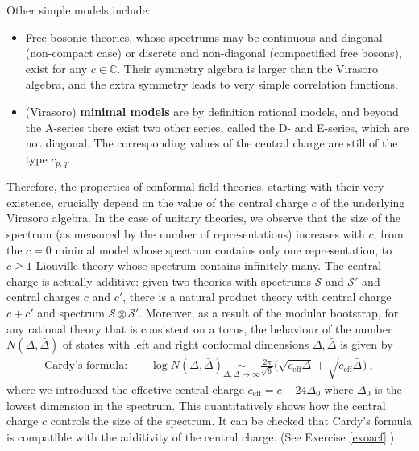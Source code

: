 \documentclass[12pt, a4paper, notitlepage, twoside]{report}
\numberwithin{equation}{section}
\theoremstyle{break}
\begin{document}
Other simple models include:
\begin{itemize}
 \item Free bosonic theories, whose spectrums may be continuous and diagonal (non-compact case) or discrete and non-diagonal (compactified free bosons), exist for any $c\in {\mathbb{C}}$.
Their symmetry algebra is larger than the Virasoro algebra, and  
the extra symmetry leads to very simple correlation functions.
 \item 
(Virasoro) \textbf{minimal models} are by definition rational models, and beyond the A-series there exist two other series, called the 
D- and E-series, which are not diagonal.
The corresponding values of the central charge are still of the type $c_{p,q}$.
\end{itemize}
Therefore,
the properties of conformal field theories, starting with their very existence, crucially depend on the value of the central charge $c$ of the underlying Virasoro algebra.
In the case of unitary theories, we observe that the size of the spectrum (as measured by the number of representations) increases with $c$, from the $c=0$ minimal model whose spectrum contains only one representation, to $c\geq 1$ Liouville theory whose spectrum contains infinitely many.
The central charge is actually additive: given two theories with spectrums $\mathcal{S}$ and $\mathcal{S}'$ and central charges $c$ and $c'$, there is a natural product theory with central charge $c+c'$ and spectrum $\mathcal{S}\otimes \mathcal{S}'$.
Moreover, as a result of the modular bootstrap, for any rational theory that is consistent on a torus, 
the behaviour of the number $N(\Delta,\bar{\Delta})$ of states with left and right conformal dimensions $\Delta,\bar{\Delta}$ is given by 
\begin{align}
\text{Cardy's formula:} \qquad \log N(\Delta,\bar{\Delta}) \underset{\Delta,\bar{\Delta}\to \infty}{\sim} \frac{2\pi}{\sqrt{6}} \Big(\sqrt{c_\text{eff} \Delta} + \sqrt{\bar c_\text{eff} \bar\Delta}\Big)\ ,
\label{nds}
\end{align}
where we introduced the effective central charge $c_\text{eff}=c-24\Delta_0$ where $\Delta_0$ is the lowest dimension in the spectrum.
This quantitatively shows how the central charge $c$ controls the size of the spectrum.
It can be checked that Cardy's formula is compatible with the additivity of the central charge. (See Exercise \ref{exoacf}.)
\end{document}
